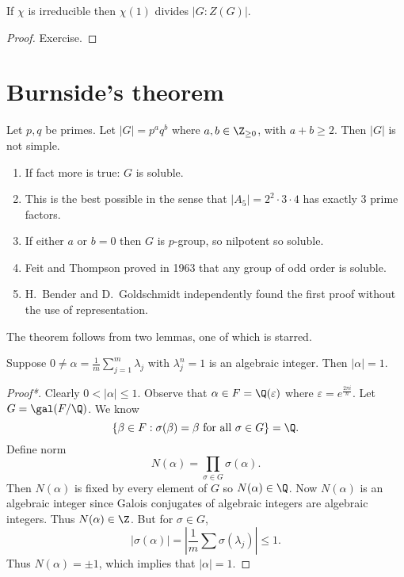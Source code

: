 \documentclass[a4paper]{article}
\theoremstyle{definition}
\begin{document}
\begin{theorem}
  If \(\chi\) is irreducible then \(\chi(1)\) divides \(|G:Z(G)|\).
\end{theorem}

\begin{proof}
  Exercise.
\end{proof}

\section{Burnside's theorem}

\begin{theorem}[Burnside]
  \label{thm:Burnside}
  Let \(p, q\) be primes. Let \(|G| = p^a q^b\) where \(a, b \in \Z_{\geq 0}\), with \(a + b \geq 2\). Then \(|G|\) is not simple.
\end{theorem}

\begin{remark}\leavevmode
  \begin{enumerate}
  \item If fact more is true: \(G\) is soluble.
  \item This is the best possible in the sense that \(|A_5| = 2^2 \cdot 3 \cdot 4\) has exactly \(3\) prime factors.
  \item If either \(a\) or \(b = 0\) then \(G\) is \(p\)-group, so nilpotent so soluble.
  \item Feit and Thompson proved in 1963 that any group of odd order is soluble.
  \item H.\ Bender and D.\ Goldschmidt independently found the first proof without the use of representation.
  \end{enumerate}
\end{remark}

The theorem follows from two lemmas, one of which is starred.

\begin{lemma}
  Suppose \(0 \neq \alpha = \frac{1}{m} \sum_{j = 1}^m \lambda_j\) with \(\lambda_j^n = 1\) is an algebraic integer. Then \(|\alpha| = 1\).
\end{lemma}

\begin{proof}[Proof*]
  Clearly \(0 < |\alpha| \leq 1\). Observe that \(\alpha \in F = \Q(\varepsilon)\) where \(\varepsilon = e^{\frac{2\pi i}{n}}\). Let \(G = \gal(F/\Q)\). We know
  \[
    \{\beta \in F: \sigma(\beta) = \beta \text{ for all } \sigma \in G\} = \Q.
  \]
  Define norm
  \[
    N(\alpha) = \prod_{\sigma \in G} \sigma(\alpha).
  \]
  Then \(N(\alpha)\) is fixed by every element of \(G\) so \(N(\alpha) \in \Q\). Now \(N(\alpha)\) is an algebraic integer since Galois conjugates of algebraic integers are algebraic integers. Thus \(N(\alpha) \in \Z\). But for \(\sigma \in G\),
  \[
    |\sigma(\alpha)| = \left| \frac{1}{m} \sum \sigma(\lambda_j) \right| \leq 1.
  \]
  Thus \(N(\alpha) = \pm 1\), which implies that \(|\alpha| = 1\).
\end{proof}
\end{document}
